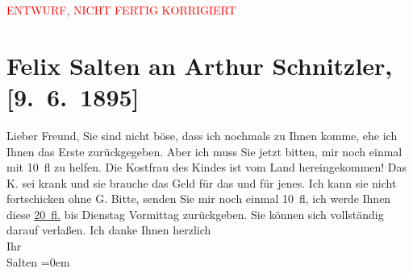 
\begin{center}
            \textcolor{red}{ENTWURF, NICHT FERTIG KORRIGIERT}
                      \end{center}
            
         
         \renewcommand{\erwaehntePersonen}{Personen:  ?? [Kostfrau von Charlotte Lamberg], Maria Charlotte Lamberg}
         \renewcommand{\erwaehnteOrte}{Orte: Wien}
         \renewcommand{\erwaehnteWerke}{}
               \section[Felix Salten an Arthur Schnitzler, {[}9. 6. 1895{]}]{ Felix Salten an Arthur Schnitzler, {[}9. 6. 1895{]}}\nopagebreak{}\rehead{ }\begin{ledgroupsized}[t]{13cm}\normalsize\beginnumbering \toendnotes[C]{\smallbreak\pagebreak[2]} 
\toendnotes[C]{\smallbreak}\pstart
           \noindent{}{\pb}Lieber Freund, Sie sind nicht böse, dass ich nochmals zu Ihnen
               komme, ehe ich Ihnen das Erste zurückgegeben. Aber ich muss Sie jetzt bitten, mir
               noch einmal mit 10 fl zu helfen. Die Kostfrau des Kindes ist vom
               Land hereingekommen! Das K. sei krank
               und sie brauche das Geld für das und für jenes. Ich kann sie nicht fortschicken ohne
               G. Bitte, senden Sie mir noch einmal 10 fl, ich {\pb}werde Ihnen diese \uline{20 fl.} bis Dienstag Vormittag  zurückgeben. Sie können sich vollständig darauf verlaßen. Ich
               danke Ihnen \pend
           \pstart
           herzlich {\\[\baselineskip]}Ihr {\\[\baselineskip]}\spacefill\mbox{Salten}\pend
           \leftskip=0em{}
         
         \endnumbering{}\end{ledgroupsized}\begin{anhang}\end{anhang}\newcommand{\dateiname}{L03156}\newcommand{\titel}{Felix Salten an Arthur Schnitzler, [9. 6. 1895]}\newcommand{\editorInnen}{Martin Anton Müller und Laura Untner}
      